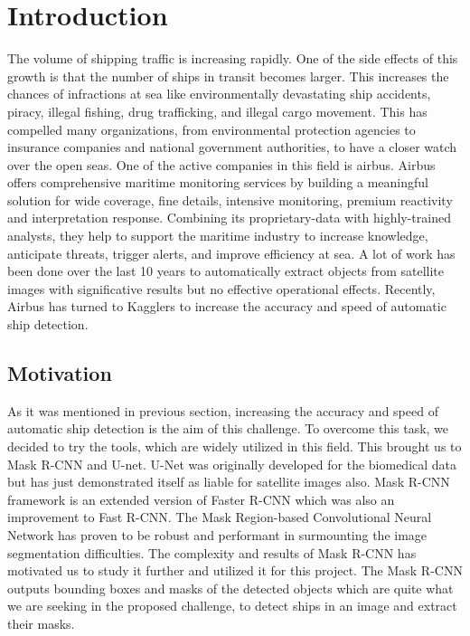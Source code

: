 \chapter{Introduction}
\label{chap:intro}

The volume of shipping traffic is increasing rapidly. One of the side effects of this growth is that the number of ships in transit becomes larger. This increases the chances of infractions at sea like environmentally devastating ship accidents, piracy, illegal fishing, drug trafficking, and illegal cargo movement. This has compelled many organizations, from environmental protection agencies to insurance companies and national government authorities, to have a closer watch over the open seas. One of the active companies in this field is airbus. Airbus offers comprehensive maritime monitoring services by building a meaningful solution for wide coverage, fine details, intensive monitoring, premium reactivity and interpretation response. Combining its proprietary-data with highly-trained analysts, they help to support the maritime industry to increase knowledge, anticipate threats, trigger alerts, and improve efficiency at sea.
A lot of work has been done over the last 10 years to automatically extract objects from satellite images with significative results but no effective operational effects. Recently, Airbus has turned to Kagglers to increase the accuracy and speed of automatic ship detection\cite{challintro}. 

\section{Motivation}
\label{sec:motivation}

As it was mentioned in previous section, increasing the accuracy and speed of automatic ship detection is the aim of this challenge. To overcome this task, we decided to try the tools, which are widely utilized in this field. This brought us to Mask R-CNN and U-net. U-Net was originally developed for the biomedical data but has just demonstrated itself as liable for satellite images also. Mask R-CNN framework is an extended version of Faster R-CNN which was also an improvement to Fast R-CNN. The Mask Region-based Convolutional Neural Network has proven to be robust and performant in surmounting the image segmentation difficulties\cite{HeGDG17}. The complexity and results of Mask R-CNN has motivated us to study it further and utilized it for this project. The Mask R-CNN outputs bounding boxes and masks of the detected objects which are quite what we are seeking in the proposed challenge, to detect ships in an image and extract their masks. 






